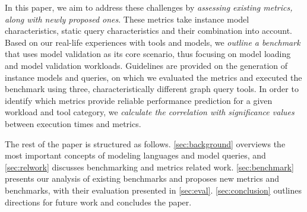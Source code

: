 In this paper, we aim to address these challenges by \emph{assessing existing metrics, along with newly proposed ones}. These metrics take instance model characteristics, static query characteristics and their combination into account. Based on our real-life experiences with tools and models, we \emph{outline a benchmark} that uses model validation as its core scenario, thus focusing on model loading and model validation workloads. Guidelines are provided on the generation of instance models and queries, on which we evaluated the metrics and executed the benchmark using three, characteristically different graph query tools. In order to identify which metrics provide reliable performance prediction for a given workload and tool category, we \emph{calculate the correlation with significance values} between execution times and metrics.


The rest of the paper is structured as follows. 
\autoref{sec:background} overviews the most important concepts of modeling languages and model queries, and 
\autoref{sec:relwork} discusses benchmarking and metrics related work.
\autoref{sec:benchmark} presents our analysis of existing benchmarks and proposes new metrics and benchmarks, with their evaluation presented in \autoref{sec:eval}.
\autoref{sec:conclusion} outlines directions for future work and concludes the paper.
